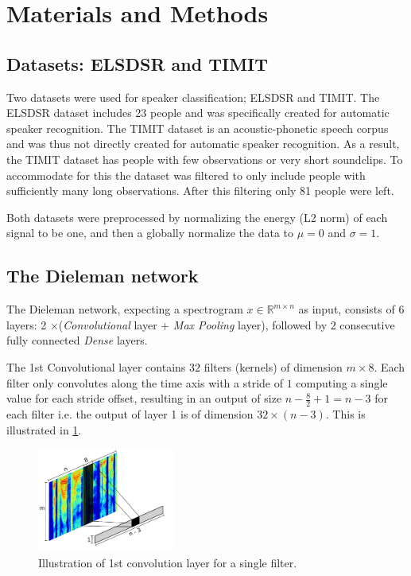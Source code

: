 \section{Materials and Methods}

\subsection{Datasets: ELSDSR and TIMIT}

Two datasets were used for speaker classification; ELSDSR and TIMIT. The ELSDSR dataset includes 23 people and was specifically created for automatic speaker recognition. The TIMIT dataset is an acoustic-phonetic speech corpus and was thus not directly created for automatic speaker recognition. As a result, the TIMIT dataset has people with few observations or very short soundclips. To accommodate for this the dataset was filtered to only include people with sufficiently many long observations. After this filtering only 81 people were left.

Both datasets were preprocessed by normalizing the energy (L2 norm) of each signal to be one, and then a globally normalize the data to $\mu = 0$ and $\sigma = 1$.

\subsection{The Dieleman network}

The Dieleman network, expecting a spectrogram $x \in \mathbb{R}^{m \times n}$ as input, consists of 6 layers: 2 $\times$(\emph{Convolutional} layer + \emph{Max Pooling} layer), followed by 2 consecutive fully connected \emph{Dense} layers.

The 1st Convolutional layer contains $32$ filters (kernels) of dimension $m \times 8$. Each filter only convolutes along the time axis with a stride of $1$ computing a single value for each stride offset, resulting in an output of size $n - \frac{8}{2} + 1 = n - 3$ for each filter i.e. the output of layer 1 is of dimension $32 \times (n-3)$. This is illustrated in \cref{fig:convolution-1}.

\begin{figure}[H]
  \centering
  \includegraphics[width=0.4\textwidth]{inkscape/convolution.pdf}
  \caption{Illustration of 1st convolution layer for a single filter.}
  \label{fig:convolution-1}
\end{figure}

